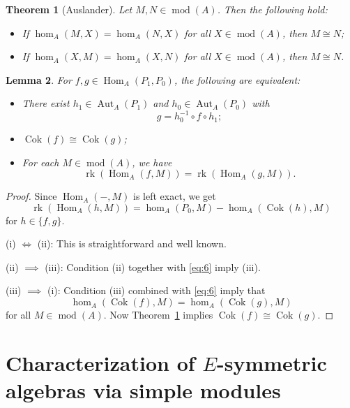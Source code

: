 \documentclass[12pt,reqno]{amsart}
\newtheorem{Thm}{Theorem}[section]
\newtheorem{Lem}[Thm]{Lemma}
\theoremstyle{definition}
\newcommand{\rk}{\operatorname{rk}}
\newcommand{\md}{\operatorname{mod}}
\newcommand{\Hom}{\operatorname{Hom}}
\newcommand{\Aut}{\operatorname{Aut}}
\newcommand{\Coker}{\operatorname{Cok}}
\begin{document}
\begin{Thm}[Auslander]\label{thm:auslander}
Let $M,N \in \md(A)$. Then the following hold:
\begin{itemize}\itemsep2mm

\item[(i)]
If $\hom_A(M,X) = \hom_A(N,X)$ for all $X \in \md(A)$,
then $M \cong N$;

\item[(ii)]
If $\hom_A(X,M) = \hom_A(X,N)$ for all $X \in \md(A)$,
then $M \cong N$.

\end{itemize}
\end{Thm}


\begin{Lem}\label{lem:cokrank}
For $f,g \in \Hom_A(P_1,P_0)$, the following are equivalent:
\begin{itemize}\itemsep2mm

\item[(i)]
There exist $h_1 \in \Aut_A(P_1)$ and $h_0 \in \Aut_A(P_0)$ with
$$
g = h_0^{-1} \circ f \circ h_1;
$$

\item[(ii)]
$\Coker(f) \cong \Coker(g)$;

\item[(iii)]
For each $M \in \md(A)$, we have
$$
\rk(\Hom_A(f,M)) = \rk(\Hom_A(g,M)).
$$ 

\end{itemize}
\end{Lem}

\begin{proof}
Since $\Hom_A(-,M)$ is left exact, we get
\begin{equation}\label{eq:6}
\rk(\Hom_A(h,M)) = \hom_A(P_0,M) - \hom_A(\Coker(h),M)
\end{equation}
for $h \in \{ f,g \}$.

(i) $\iff$ (ii): This is straightforward and well known.

(ii) $\implies$ (iii):
Condition (ii) together with \eqref{eq:6} imply (iii).

(iii) $\implies$ (i):
Condition (iii) combined with \eqref{eq:6} imply that
$$\hom_A(\Coker(f),M) = \hom_A(\Coker(g),M)$$ for
all $M \in \md(A)$.
Now Theorem~\ref{thm:auslander} implies $\Coker(f) \cong \Coker(g)$.
\end{proof}



\section{Characterization of $E$-symmetric algebras via simple modules}\label{sec:3}
\end{document}
